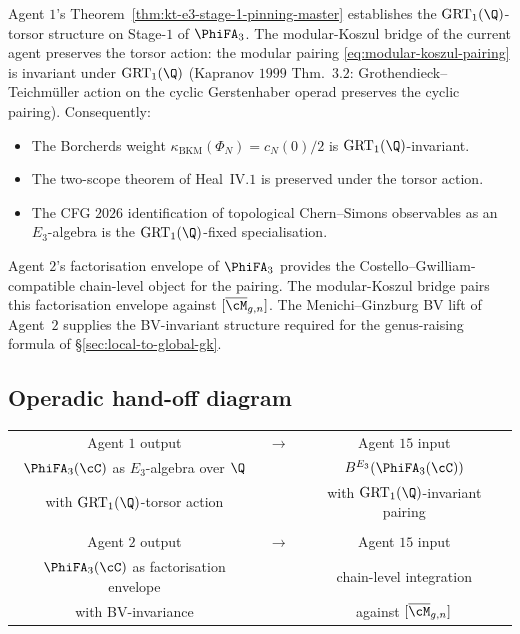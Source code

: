 Agent $1$'s Theorem~\ref{thm:kt-e3-stage-1-pinning-master} establishes
the $\mathrm{GRT}_1(\Q)$-torsor structure on Stage-$1$ of $\PhiFA_3$.
The modular-Koszul bridge of the current agent preserves the torsor
action: the modular pairing \eqref{eq:modular-koszul-pairing} is
invariant under $\mathrm{GRT}_1(\Q)$ (Kapranov $1999$ Thm.~$3.2$:
Grothendieck--Teichm\"uller action on the cyclic Gerstenhaber operad
preserves the cyclic pairing). Consequently:
\begin{itemize}
\item The Borcherds weight $\kappa_{\mathrm{BKM}}(\Phi_N) = c_N(0)/2$
is $\mathrm{GRT}_1(\Q)$-invariant.
\item The two-scope theorem of Heal~IV.$1$ is preserved under the
torsor action.
\item The CFG $2026$ identification of topological Chern--Simons
observables as an $E_3$-algebra is the $\mathrm{GRT}_1(\Q)$-fixed
specialisation.
\end{itemize}

Agent $2$'s factorisation envelope of $\PhiFA_3$ provides the
Costello--Gwilliam-compatible chain-level object for the pairing. The
modular-Koszul bridge pairs this factorisation envelope against
$[\overline{\cM}_{g, n}]$. The Menichi--Ginzburg BV lift of Agent~$2$
supplies the BV-invariant structure required for the genus-raising
formula of \S\ref{sec:local-to-global-gk}.

\subsection*{Operadic hand-off diagram}

\begin{center}
\begin{tabular}{ccc}
Agent $1$ output & $\longrightarrow$ & Agent $15$ input \\
$\PhiFA_3(\cC)$ as $E_3$-algebra over $\Q$ & & $B^{E_3}(\PhiFA_3(\cC))$ \\
with $\mathrm{GRT}_1(\Q)$-torsor action & & with $\mathrm{GRT}_1(\Q)$-invariant pairing \\
 & & \\
Agent $2$ output & $\longrightarrow$ & Agent $15$ input \\
$\PhiFA_3(\cC)$ as factorisation envelope & & chain-level integration \\
with BV-invariance & & against $[\overline{\cM}_{g, n}]$ \\
\end{tabular}
\end{center}

